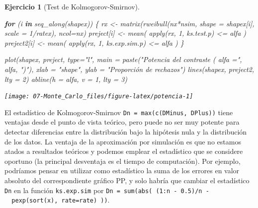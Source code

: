 \documentclass[
  10pt,
]{book}
\newenvironment{Shaded}{\begin{snugshade}}{\end{snugshade}}
\newcommand{\AttributeTok}[1]{\textcolor[rgb]{0.77,0.63,0.00}{#1}}
\newcommand{\ControlFlowTok}[1]{\textcolor[rgb]{0.13,0.29,0.53}{\textbf{#1}}}
\newcommand{\DecValTok}[1]{\textcolor[rgb]{0.00,0.00,0.81}{#1}}
\newcommand{\FunctionTok}[1]{\textcolor[rgb]{0.00,0.00,0.00}{#1}}
\newcommand{\NormalTok}[1]{#1}
\newcommand{\OtherTok}[1]{\textcolor[rgb]{0.56,0.35,0.01}{#1}}
\newcommand{\SpecialCharTok}[1]{\textcolor[rgb]{0.00,0.00,0.00}{#1}}
\newcommand{\StringTok}[1]{\textcolor[rgb]{0.31,0.60,0.02}{#1}}
\theoremstyle{break}
\newtheorem{exercise}{Ejercicio}[chapter]
\theoremstyle{nonumberplain}
\begin{document}
\begin{exercise}[Test de Kolmogorov-Smirnov]
\begin{enumerate}
\begin{Shaded}
\begin{Highlighting}[]
\ControlFlowTok{for}\NormalTok{ (i }\ControlFlowTok{in} \FunctionTok{seq\_along}\NormalTok{(shapex)) \{ }
\NormalTok{  rx }\OtherTok{\textless{}{-}} \FunctionTok{matrix}\NormalTok{(}\FunctionTok{rweibull}\NormalTok{(nx}\SpecialCharTok{*}\NormalTok{nsim, }\AttributeTok{shape =}\NormalTok{ shapex[i], }\AttributeTok{scale =} \DecValTok{1}\SpecialCharTok{/}\NormalTok{ratex), }\AttributeTok{ncol=}\NormalTok{nx)}
\NormalTok{  preject[i] }\OtherTok{\textless{}{-}} \FunctionTok{mean}\NormalTok{( }\FunctionTok{apply}\NormalTok{(rx, }\DecValTok{1}\NormalTok{, ks.test.p) }\SpecialCharTok{\textless{}=}\NormalTok{ alfa )}
\NormalTok{  preject2[i] }\OtherTok{\textless{}{-}} \FunctionTok{mean}\NormalTok{( }\FunctionTok{apply}\NormalTok{(rx, }\DecValTok{1}\NormalTok{, ks.exp.sim.p) }\SpecialCharTok{\textless{}=}\NormalTok{ alfa )}
\NormalTok{\}}

\FunctionTok{plot}\NormalTok{(shapex, preject, }\AttributeTok{type=}\StringTok{"l"}\NormalTok{, }\AttributeTok{main =} \FunctionTok{paste}\NormalTok{(}\StringTok{"Potencia del contraste ( alfa ="}\NormalTok{, alfa, }\StringTok{")"}\NormalTok{), }
     \AttributeTok{xlab =} \StringTok{"shape"}\NormalTok{, }\AttributeTok{ylab =} \StringTok{"Proporción de rechazos"}\NormalTok{)}
\FunctionTok{lines}\NormalTok{(shapex, preject2, }\AttributeTok{lty =} \DecValTok{2}\NormalTok{)}
\FunctionTok{abline}\NormalTok{(}\AttributeTok{h =}\NormalTok{ alfa, }\AttributeTok{v =} \DecValTok{1}\NormalTok{, }\AttributeTok{lty =} \DecValTok{3}\NormalTok{)}
\end{Highlighting}
\end{Shaded}

  \begin{center}\texttt{[image: 07-Monte\_Carlo\_files/figure-latex/potencia-1]} \end{center}
\end{enumerate}

\end{exercise}

El estadístico de Kolmogorov-Smirnov \texttt{Dn\ =\ max(c(DMinus,\ DPlus))} tiene ventajas desde el
punto de vista teórico, pero puede no ser muy potente para detectar diferencias entre la
distribución bajo la hipótesis nula y la distribución de los datos.
La ventaja de la aproximación por simulación es que no estamos atados a resultados teóricos
y podemos emplear el estadístico que se considere oportuno
(la principal desventaja es el tiempo de computación).
Por ejemplo, podríamos pensar en utilizar como estadístico la suma de los errores en
valor absoluto del correspondiente gráfico PP, y solo habría que cambiar el estadístico
\texttt{Dn} en la función \texttt{ks.exp.sim} por \texttt{Dn\ =\ sum(abs(\ (1:n\ -\ 0.5)/n\ -\ \ pexp(sort(x),\ rate=rate)\ ))}.
\end{document}
